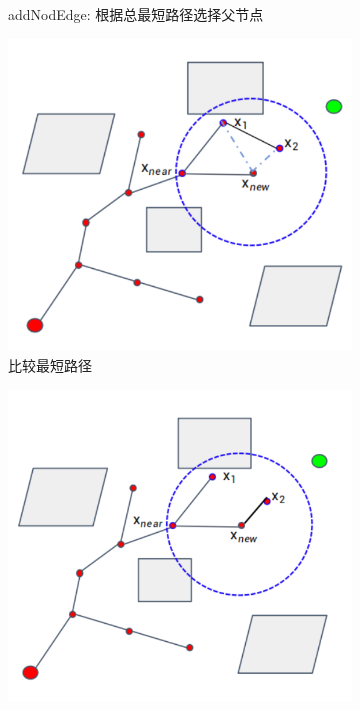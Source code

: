\documentclass[../main.tex]{subfiles}
\begin{document}
\begin{enumerate}
\begin{figure}[H]
\begin{subfigure}[b]{0.19\textwidth}
                    \caption{addNodEdge: 根据总最短路径选择父节点}
                    \label{fig:rrts3}
                \end{subfigure}
                \begin{subfigure}[b]{0.19\textwidth}
                    \includegraphics[width=\linewidth]{images/rrts/rrts4.png}
                    \caption{比较最短路径}
                    \label{fig:rrts4}
                \end{subfigure}
                \begin{subfigure}[b]{0.19\textwidth}
                    \includegraphics[width=\linewidth]{images/rrts/rrts5.png}

\end{subfigure}
\end{figure}
\end{enumerate}
\end{document}
